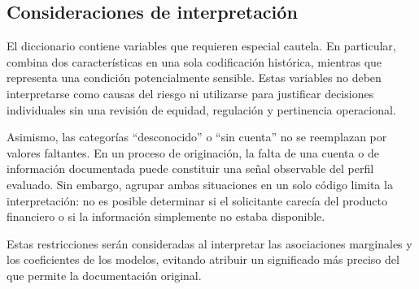 \subsection{Consideraciones de interpretación}

El diccionario contiene variables que requieren especial cautela. En
particular,  combina dos características
en una sola codificación histórica, mientras que
 representa una condición potencialmente
sensible. Estas variables no deben interpretarse como causas del riesgo
ni utilizarse para justificar decisiones individuales sin una revisión
de equidad, regulación y pertinencia operacional.

Asimismo, las categorías ``desconocido'' o ``sin cuenta'' no se
reemplazan por valores faltantes. En un proceso de originación, la falta
de una cuenta o de información documentada puede constituir una señal
observable del perfil evaluado. Sin embargo, agrupar ambas situaciones
en un solo código limita la interpretación: no es posible determinar si
el solicitante carecía del producto financiero o si la información
simplemente no estaba disponible.

Estas restricciones serán consideradas al interpretar las asociaciones
marginales y los coeficientes de los modelos, evitando atribuir un
significado más preciso del que permite la documentación original.

